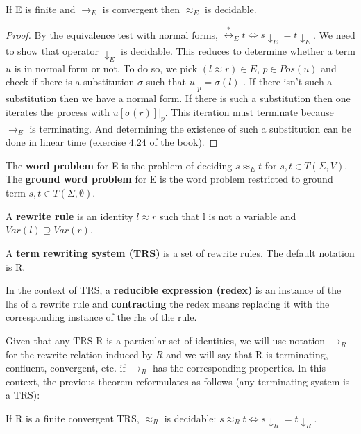 \begin{theorem}\label{4.1.1}
If E is finite and $\to_E$ is convergent then $\approx_E$ is decidable.
\end{theorem}
\begin{proof}
By the equivalence test with normal forms, $\stackrel{*}{\leftrightarrow}_E t \iff s\downarrow_E = t\downarrow_E$. We need to show that operator $\downarrow_E$ is decidable.  This reduces to determine whether a term $u$ is in normal form or not. To do so, we pick $(l \approx r) \in E$, $p \in Pos(u)$ and check if there is a substitution $\sigma$ such that $u|_p = \sigma(l)$ . If there isn't such a substitution then we have a normal form. If there is such a substitution then one iterates the process with $u[\sigma(r)]|_p$. This iteration must terminate because $\to_E$ is terminating. And determining the existence of such a substitution can be done in linear time (exercise 4.24 of the book).  
\end{proof}

\begin{definition}
The \textbf{word problem} for E is the problem of deciding $s \approx_E t$ for $s,t \in T(\Sigma,V)$. The \textbf{ground word problem} for E is the word problem restricted to ground term $s,t \in T(\Sigma,\emptyset)$.
\end{definition}

\begin{definition}
A \textbf{rewrite rule} is an identity $l \approx r$ such that l is not a variable and $Var(l) \supseteq Var(r)$. 

A \textbf{term rewriting system (TRS)} is a set of rewrite rules. The default notation is R. 

In the context of TRS, a \textbf{reducible expression (redex)} is an instance of the lhs of a rewrite rule and \textbf{contracting} the redex means replacing it with the corresponding instance of the rhs of the rule. 
\end{definition}

Given that any TRS R is a particular set of identities, we will use notation $\to_R$ for the rewrite relation induced by $R$ and we will say that R is terminating, confluent, convergent, etc. if $\to_R$ has the corresponding properties. In this context, the previous theorem reformulates as follows (any terminating system is a TRS): 

\begin{corollary}
If R is a finite convergent TRS, $\approx_R$ is decidable: $s \approx_R t \iff s \downarrow_R = t \downarrow_R$.
\end{corollary}

